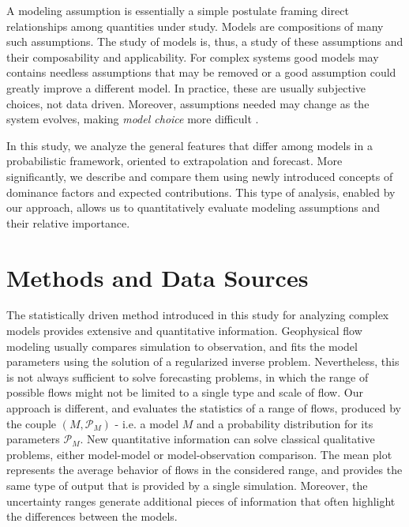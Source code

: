 \documentclass{article}
\begin{document}
A modeling assumption is essentially a simple postulate framing direct relationships among quantities under study. Models are compositions of many such assumptions. The study of models is, thus, a study of these assumptions and their composability and applicability. For complex systems good models may contains needless assumptions that may be removed or a good assumption could greatly improve a different model. In practice, these are usually subjective choices, not data driven. Moreover, assumptions needed may change as the system evolves, making {\em model choice} more difficult \citep{Patra2018b}.

In this study, we analyze the general features that differ among models  in a probabilistic framework, oriented to extrapolation and forecast. More significantly, we describe and compare them using newly introduced  concepts of dominance factors and expected contributions. This type of analysis, enabled by our approach, allows us to quantitatively evaluate modeling assumptions and their relative importance.

\section{Methods and Data Sources}
The statistically driven method introduced in this study for analyzing complex models provides extensive and quantitative information. Geophysical flow modeling usually compares simulation to observation, and fits the model parameters using the solution of a regularized inverse problem. Nevertheless, this is not always sufficient to solve forecasting problems, in which the range of possible flows might not be limited to a single type and scale of flow. Our approach is different, and evaluates the statistics of a range of flows, produced by the couple $\left(M, \mathcal P_M\right)$ - i.e. a model $M$ and a probability distribution for its parameters $\mathcal P_M$. New quantitative information can solve classical qualitative problems, either model-model or model-observation comparison. The mean plot represents the average behavior of flows in the considered range, and provides the same type of output that is provided by a single simulation. Moreover, the uncertainty ranges generate additional pieces of information that often highlight the differences between the models.
\end{document}
